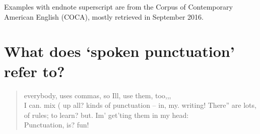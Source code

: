 \documentclass[charis,linguex,biblatex]{glossa}
\begin{document}
Examples with endnote superscript are from the Corpus of Contemporary American English (COCA), mostly retrieved in September 2016.


\section{What does `spoken punctuation' refer to?}

 \begin{quote}
  everybody, uses commas, so Ill, use them, too,,, \\
  I can. mix ( up all? kinds of punctuation -- in, my. writing! There'' are lots, of rules; to learn? but. Im' get'ting them in my head: \\
  Punctuation, is? fun!
 \end{quote}
\end{document}
